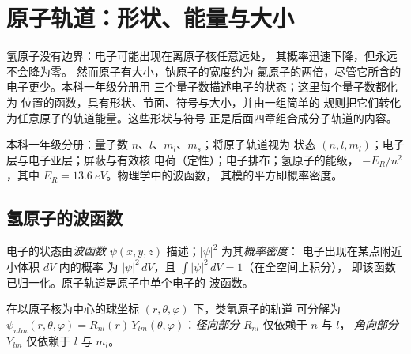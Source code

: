 \chapter{原子轨道：形状、能量与大小}\label{ch:b2:atomic-orbitals}

氢原子没有边界：电子可能出现在离原子核任意远处，
其概率迅速下降，但永远不会降为零。
然而原子有大小，钠原子的宽度约为
氯原子的两倍，尽管它所含的电子更少。本科一年级分册用
三个量子数描述电子的状态；这里每个量子数都化为
位置的函数，具有形状、节面、符号与大小，并由一组简单的
规则把它们转化为任意原子的轨道能量。这些形状与符号
正是后面四章组合成分子轨道的内容。

\begin{recall}
本科一年级分册：量子数 $n$、$l$、$m_l$、$m_s$；将原子轨道视为
状态 $(n, l, m_l)$；电子层与电子亚层；屏蔽与有效核
电荷（定性）；电子排布；氢原子的能级，
$-E_R/n^2$，其中 $E_R = \qty{13.6}{eV}$。物理学中的波函数，
其模的平方即概率密度。
\end{recall}

\section{氢原子的波函数}

\begin{definition}[波函数]\label{def:b2:atomic-orbitals:wavefunction}
电子的状态由\emph{波函数}
$\psi(x, y, z)$ 描述；$|\psi|^2$ 为其\emph{概率密度}：
电子出现在某点附近小体积 $dV$ 内的概率
为 $|\psi|^2\,dV$，且 $\int|\psi|^2\,dV = 1$（在全空间上积分），
即该函数已归一化。原子轨道是原子中单个电子的
波函数。
\end{definition}

\begin{definition}[径向部分与角向部分]\label{def:b2:atomic-orbitals:radial-angular}
在以原子核为中心的球坐标 $(r, \theta, \varphi)$ 下，类氢原子的轨道
可分解为 $\psi_{nlm}(r, \theta, \varphi) = R_{nl}(r)\,
Y_{lm}(\theta, \varphi)$：\emph{径向部分} $R_{nl}$ 仅依赖于 $n$ 与 $l$，
\emph{角向部分} $Y_{lm}$ 仅依赖于 $l$ 与
$m_l$。
\end{definition}

